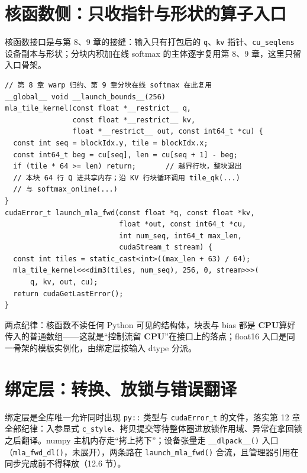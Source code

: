\documentclass[12pt,a4paper,fontset=fandol]{ctexbook}
\newcommand{\Fn}[1]{\texttt{#1()}}
\newcommand{\Tp}[1]{\texttt{#1}}
\newcommand{\Dom}[1]{\textsf{\bfseries #1}}
\newcommand{\CPU}{\Dom{CPU}}
\begin{document}
\section{核函数侧：只收指针与形状的算子入口}

核函数接口是与第 8、9 章的接缝：输入只有打包后的 \Tp{q}、\Tp{kv} 指针、\Tp{cu\_seqlens} 设备副本与形状；分块内积加在线 softmax 的主体逐字复用第 8、9 章，这里只留入口骨架。

\begin{lstlisting}[style=cudastyle,caption={kernels/mla\_fwd.cu：算子入口与 launch}]
// 第 8 章 warp 归约、第 9 章分块在线 softmax 在此复用
__global__ void __launch_bounds__(256)
mla_tile_kernel(const float *__restrict__ q,
                const float *__restrict__ kv,
                float *__restrict__ out, const int64_t *cu) {
  const int seq = blockIdx.y, tile = blockIdx.x;
  const int64_t beg = cu[seq], len = cu[seq + 1] - beg;
  if (tile * 64 >= len) return;       // 越界行块，整块退出
  // 本块 64 行 Q 进共享内存；沿 KV 行块循环调用 tile_qk(...)
  // 与 softmax_online(...)
}
cudaError_t launch_mla_fwd(const float *q, const float *kv,
                           float *out, const int64_t *cu,
                           int num_seq, int64_t max_len,
                           cudaStream_t stream) {
  const int tiles = static_cast<int>((max_len + 63) / 64);
  mla_tile_kernel<<<dim3(tiles, num_seq), 256, 0, stream>>>(
      q, kv, out, cu);
  return cudaGetLastError();
}
\end{lstlisting}
两点纪律：核函数不读任何 Python 可见的结构体，块表与 bias 都是 \CPU{}算好传入的普通数组——这就是``控制流留 \CPU{}''在接口上的落点；float16 入口是同一骨架的模板实例化，由绑定层按输入 dtype 分派。

\section{绑定层：转换、放锁与错误翻译}

绑定层是全库唯一允许同时出现 \Tp{py::} 类型与 \Tp{cudaError\_t} 的文件，落实第 12 章全部纪律：入参显式 \Tp{c\_style}、拷贝提交等待整体圈进放锁作用域、异常在拿回锁之后翻译。numpy 主机内存走``拷上拷下''；设备张量走 \Tp{\_\_dlpack\_\_()} 入口（\Fn{mla\_fwd\_dl}，未展开），两条路在 \Fn{launch\_mla\_fwd} 合流，且管理器引用在同步完成前不得释放（12.6 节）。
\end{document}
